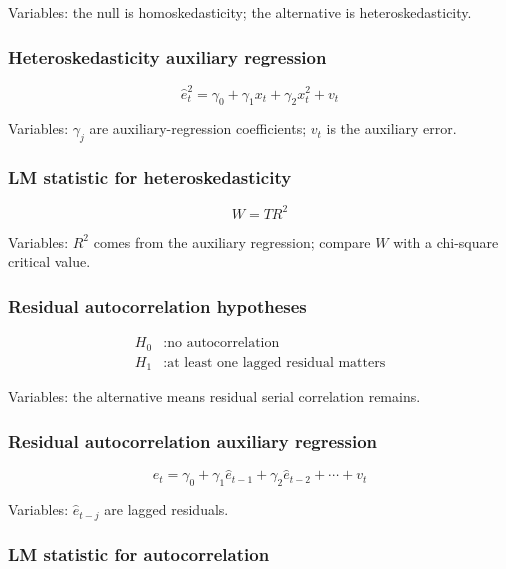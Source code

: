 \documentclass[
  8pt,
  twocolumn]{extarticle}
\begin{document}
Variables: the null is homoskedasticity; the alternative is
heteroskedasticity.

\subsubsection{Heteroskedasticity auxiliary
regression}\label{heteroskedasticity-auxiliary-regression}

\[
\hat e_t^2=\gamma_0+\gamma_1x_t+\gamma_2x_t^2+v_t
\]

Variables: \(\gamma_j\) are auxiliary-regression coefficients; \(v_t\)
is the auxiliary error.

\subsubsection{LM statistic for
heteroskedasticity}\label{lm-statistic-for-heteroskedasticity}

\[
W=TR^2
\]

Variables: \(R^2\) comes from the auxiliary regression; compare \(W\)
with a chi-square critical value.

\subsubsection{Residual autocorrelation
hypotheses}\label{residual-autocorrelation-hypotheses}

\[
\begin{aligned}
H_0&:\text{no autocorrelation}\\
H_1&:\text{at least one lagged residual matters}
\end{aligned}
\]

Variables: the alternative means residual serial correlation remains.

\subsubsection{Residual autocorrelation auxiliary
regression}\label{residual-autocorrelation-auxiliary-regression}

\[
\hat e_t=\gamma_0+\gamma_1\hat e_{t-1}+\gamma_2\hat e_{t-2}+\cdots+v_t
\]

Variables: \(\hat e_{t-j}\) are lagged residuals.

\subsubsection{LM statistic for
autocorrelation}\label{lm-statistic-for-autocorrelation}
\end{document}
